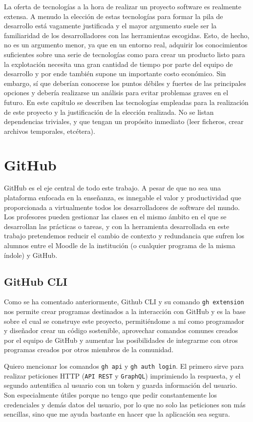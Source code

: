 La oferta de tecnologías a la hora de realizar un proyecto software es realmente extensa. A menudo la elección de estas tecnologías para formar la pila de desarrollo está vagamente justificada y el mayor argumento suele ser la familiaridad de los desarrolladores con las herramientas escogidas. Esto, de hecho, no es un argumento menor, ya que en un entorno real, adquirir los conocimientos suficientes sobre una serie de tecnologías como para crear un producto listo para la explotación necesita una gran cantidad de tiempo por parte del equipo de desarrollo y por ende también supone un importante costo económico. Sin embargo, sí que deberían conocerse los puntos débiles y fuertes de las principales opciones y debería realizarse un análisis para evitar problemas graves en el futuro. En este capítulo se describen las tecnologías empleadas para la realización de este proyecto y la justificación de la elección realizada. No se listan dependencias triviales, y que tengan un propósito inmediato (leer ficheros, crear archivos temporales, etcétera).


\section{GitHub}
GitHub es el eje central de todo este trabajo. A pesar de que no sea una plataforma enfocada en la enseñanza, es innegable el valor y productividad que proporcionada a virtualmente todos los desarrolladores de software del mundo. Los profesores pueden gestionar las clases en el mismo ámbito en el que se desarrollan las prácticas o tareas, y con la herramienta desarrollada en este trabajo pretendemos reducir el cambio de contexto y redundancia que sufren los alumnos entre el Moodle de la institución (o cualquier programa de la misma índole) y GitHub.

\subsection{GitHub CLI} 
Como se ha comentado anteriormente, Github CLI\cite{gh-cli} y su comando \verb|gh extension| nos permite crear programas destinados a la interacción con GitHub y es la base sobre el cual se construye este proyecto, permitiéndome a mí como programador y diseñador crear un código sostenible, aprovechar comandos comunes creados por el equipo de GitHub y aumentar las posibilidades de integrarme con otros programas creados por otros miembros de la comunidad.

Quiero mencionar los comandos \verb|gh api|\cite{gh-api} y \verb|gh auth login|\cite{gh-auth-login}. El primero sirve para realizar peticiones HTTP (\verb|API REST| y \verb|GraphQL|) imprimiendo la respuesta, y el segundo autentifica al usuario con un token y guarda información del usuario. Son especialmente útiles porque no tengo que pedir constantemente los credenciales y demás datos del usuario, por lo que no solo las peticiones son más sencillas, sino que me ayuda bastante en hacer que la aplicación sea segura.

